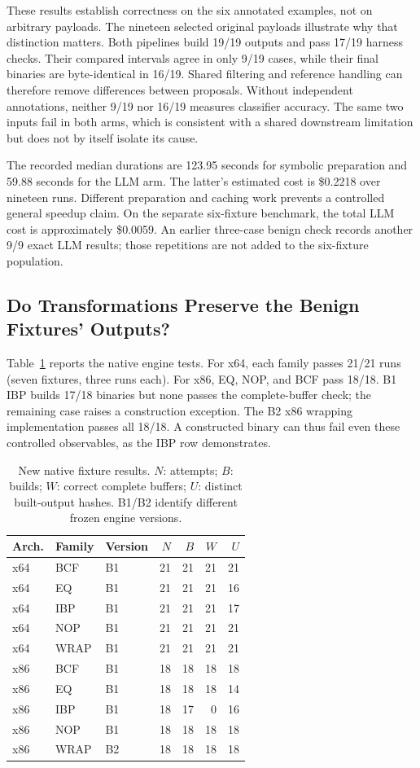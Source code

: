 These results establish correctness on the six annotated examples, not on
arbitrary payloads. The nineteen selected original payloads illustrate
why that distinction matters. Both pipelines build 19/19 outputs and pass
17/19 harness checks. Their compared intervals agree in only 9/19 cases,
while their final binaries are byte-identical in 16/19. Shared filtering
and reference handling can therefore remove differences between proposals.
Without independent annotations, neither 9/19 nor 16/19 measures classifier
accuracy. The same two inputs fail in both arms, which is consistent with
a shared downstream limitation but does not by itself isolate its cause.

The recorded median durations are 123.95 seconds for symbolic preparation
and 59.88 seconds for the LLM arm. The latter's estimated cost is \$0.2218
over nineteen runs. Different preparation and caching work prevents a
controlled general speedup claim. On the separate six-fixture benchmark,
the total LLM cost is approximately \$0.0059. An earlier three-case benign
check records another 9/9 exact LLM results; those repetitions are not
added to the six-fixture population.

\subsection{Do Transformations Preserve the Benign Fixtures' Outputs?}
Table~\ref{tab:new_native} reports the native engine tests. For x64, each
family passes 21/21 runs (seven fixtures, three runs each). For x86, EQ,
NOP, and BCF pass 18/18. B1 IBP builds 17/18 binaries but none passes the
complete-buffer check; the remaining case raises a construction exception.
The B2 x86 wrapping implementation passes all 18/18. A constructed binary
can thus fail even these controlled observables, as the IBP row demonstrates.


\begin{table}[t]
\caption{New native fixture results. $N$: attempts; $B$: builds;
$W$: correct complete buffers; $U$: distinct built-output hashes.
B1/B2 identify different frozen engine versions.}
\label{tab:new_native}
\centering\small
\begin{tabular}{@{}lllrrrr@{}}
\toprule
Arch. & Family & Version & $N$ & $B$ & $W$ & $U$ \\
\midrule
x64 & BCF & B1 & 21 & 21 & 21 & 21 \\
x64 & EQ & B1 & 21 & 21 & 21 & 16 \\
x64 & IBP & B1 & 21 & 21 & 21 & 17 \\
x64 & NOP & B1 & 21 & 21 & 21 & 21 \\
x64 & WRAP & B1 & 21 & 21 & 21 & 21 \\
x86 & BCF & B1 & 18 & 18 & 18 & 18 \\
x86 & EQ & B1 & 18 & 18 & 18 & 14 \\
x86 & IBP & B1 & 18 & 17 & 0 & 16 \\
x86 & NOP & B1 & 18 & 18 & 18 & 18 \\
x86 & WRAP & B2 & 18 & 18 & 18 & 18 \\
\bottomrule
\end{tabular}
\end{table}


